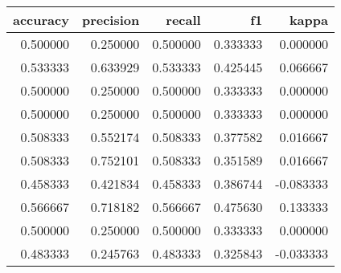 \begin{tabular}{rrrrr}
\toprule
accuracy & precision & recall & f1 & kappa \\
\midrule
0.500000 & 0.250000 & 0.500000 & 0.333333 & 0.000000 \\
0.533333 & 0.633929 & 0.533333 & 0.425445 & 0.066667 \\
0.500000 & 0.250000 & 0.500000 & 0.333333 & 0.000000 \\
0.500000 & 0.250000 & 0.500000 & 0.333333 & 0.000000 \\
0.508333 & 0.552174 & 0.508333 & 0.377582 & 0.016667 \\
0.508333 & 0.752101 & 0.508333 & 0.351589 & 0.016667 \\
0.458333 & 0.421834 & 0.458333 & 0.386744 & -0.083333 \\
0.566667 & 0.718182 & 0.566667 & 0.475630 & 0.133333 \\
0.500000 & 0.250000 & 0.500000 & 0.333333 & 0.000000 \\
0.483333 & 0.245763 & 0.483333 & 0.325843 & -0.033333 \\
\bottomrule
\end{tabular}
